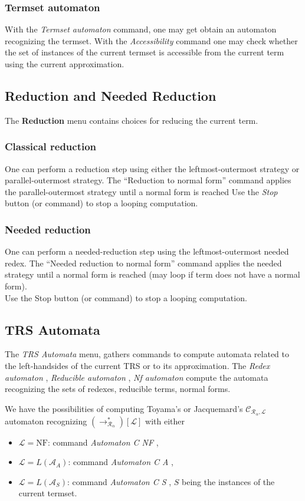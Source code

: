 \documentclass[11pt]{llncs}
\newcommand{\A}{\mathcal{A}}
\newcommand{\CC}{\mathcal{C}}
\newcommand{\RR}{\mathcal{R}}
\newcommand{\LL}{\mathcal{L}}
\newcommand{\RRa}{{\RR_\alpha}}
\newcommand{\NF}{\text{NF}}
\def\autocom#1{\textsl{#1 }}
\begin{document}
\subsubsection{Termset automaton}
With the \autocom{Termset automaton} command, 
one may get obtain an automaton recognizing the termset.
With the \autocom{Accessibility} command one may check whether
the set of instances of the current termset is accessible from
the current term using the current approximation.

\subsection{Reduction and Needed Reduction}
The \textbf{Reduction} menu contains choices for reducing
the current term.
\subsubsection{Classical reduction}
One can perform a reduction step using either
the leftmost-outermost strategy or parallel-outermost strategy.
The ``Reduction to normal form'' command applies 
the parallel-outermost strategy
until a normal form is reached 
Use the \autocom{Stop} button (or command) to stop a looping computation.

\subsubsection{Needed reduction}
One can perform a needed-reduction step
using the leftmost-outermost needed redex.
The ``Needed reduction to normal form'' command applies the needed strategy
until a normal form is reached 
(may loop if term does not have a normal form).\\
Use the Stop button (or command) to stop a looping computation.

\subsection{TRS Automata}
The \autocom{TRS Automata} menu, gathers commands to compute
automata related to
the left-handsides of the current TRS or to its approximation.
The \autocom{Redex automaton}, \autocom{Reducible automaton},
\autocom{Nf automaton} compute the automata recognizing
the sets of redexes, reducible terms, normal forms.

We have the possibilities of computing Toyama's or Jacquemard's 
$\CC_{\RRa,\LL}$ automaton recognizing $(\to_\RRa^*)[\LL]$
with either \\
\begin{itemize}
\item $\LL = \NF$: command \autocom{Automaton C NF}, 
\item $\LL = L(\A_A)$: command \autocom{Automaton C A}, 
\item  $\LL = L(\A_{S})$: command \autocom{Automaton C S}, 
$S$ being the instances of the current termset.
\end{itemize}
\end{document}
